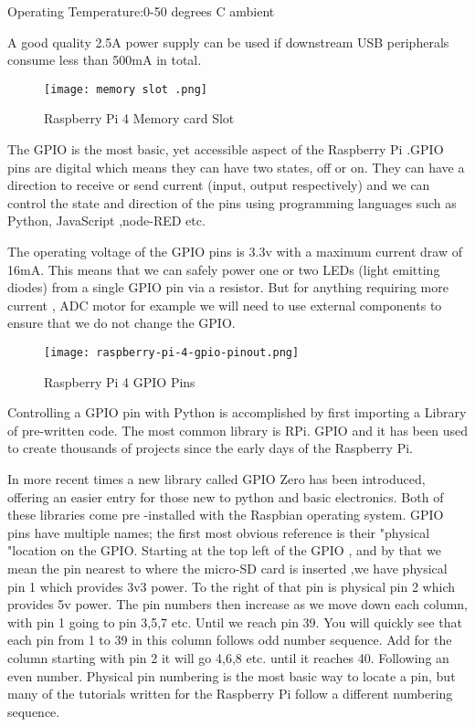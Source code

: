 \documentclass[12pt,a4paper]{report}
\begin{document}
\noindent  Operating Temperature:0-50 degrees C ambient

\noindent  A good quality 2.5A power supply can be used if downstream USB peripherals consume less than 500mA in total.

\noindent \textbf{}
\newpage
\begin{figure}[htp]
    \texttt{[image: memory slot .png]}
    \caption{Raspberry Pi 4 Memory card Slot }
\end{figure}
\noindent

\noindent \textbf{}

\noindent The GPIO is the most basic, yet accessible aspect of the Raspberry Pi .GPIO pins are digital which means they can have two states, off or on. They can have a direction to receive or send current (input, output respectively) and we can control the state and direction of the pins using programming languages such as Python, JavaScript ,node-RED etc.

\noindent        The operating voltage of the GPIO pins is 3.3v with a maximum current draw of 16mA. This means that we can safely power one or two LEDs (light emitting diodes) from a single GPIO pin via a resistor. But for anything requiring more current , ADC motor for example we will need to use external components to ensure that we do not change the GPIO.

\begin{figure}[htp]
    \texttt{[image: raspberry-pi-4-gpio-pinout.png]}
    \caption{Raspberry Pi 4 GPIO Pins }
\end{figure}
\noindent Controlling a GPIO pin with Python is accomplished by first importing a Library of pre-written code. The most common library is RPi. GPIO and it has been used to create thousands of projects since the early days of the Raspberry Pi.

\noindent In more recent times a new library called GPIO Zero has been introduced, offering an easier entry for those new to python and basic electronics. Both of these libraries come pre -installed with the Raspbian operating system. GPIO pins have multiple names; the first most obvious reference is their "physical "location on the GPIO. Starting at the top left of the GPIO , and by that we mean the pin nearest to where the micro-SD card is inserted ,we have physical pin 1 which provides 3v3 power. To the right of that pin is physical pin 2 which provides 5v power. The pin numbers then increase as we move down each column, with pin 1 going to pin 3,5,7 etc. Until we reach pin 39. You will quickly see that each pin from 1 to 39 in this column follows odd number sequence. Add for the column starting with pin 2 it will go 4,6,8 etc. until it reaches 40. Following an even number. Physical pin numbering is the most basic way to locate a pin, but many of the tutorials written for the Raspberry Pi follow a different numbering sequence. 
\end{document}
